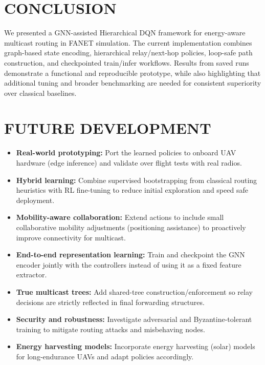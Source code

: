 \documentclass[conference]{IEEEtran}
\begin{document}
\section{CONCLUSION}
We presented a GNN-assisted Hierarchical DQN framework for energy-aware multicast routing in FANET simulation. The current implementation combines graph-based state encoding, hierarchical relay/next-hop policies, loop-safe path construction, and checkpointed train/infer workflows. Results from saved runs demonstrate a functional and reproducible prototype, while also highlighting that additional tuning and broader benchmarking are needed for consistent superiority over classical baselines.

\section{FUTURE DEVELOPMENT}
\begin{itemize}
    \item \textbf{Real-world prototyping:} Port the learned policies to onboard UAV hardware (edge inference) and validate over flight tests with real radios.
    \item \textbf{Hybrid learning:} Combine supervised bootstrapping from classical routing heuristics with RL fine-tuning to reduce initial exploration and speed safe deployment.
    \item \textbf{Mobility-aware collaboration:} Extend actions to include small collaborative mobility adjustments (positioning assistance) to proactively improve connectivity for multicast.
    \item \textbf{End-to-end representation learning:} Train and checkpoint the GNN encoder jointly with the controllers instead of using it as a fixed feature extractor.
    \item \textbf{True multicast trees:} Add shared-tree construction/enforcement so relay decisions are strictly reflected in final forwarding structures.
    \item \textbf{Security and robustness:} Investigate adversarial and Byzantine-tolerant training to mitigate routing attacks and misbehaving nodes.
    \item \textbf{Energy harvesting models:} Incorporate energy harvesting (solar) models for long-endurance UAVs and adapt policies accordingly.
\end{itemize}
\end{document}
